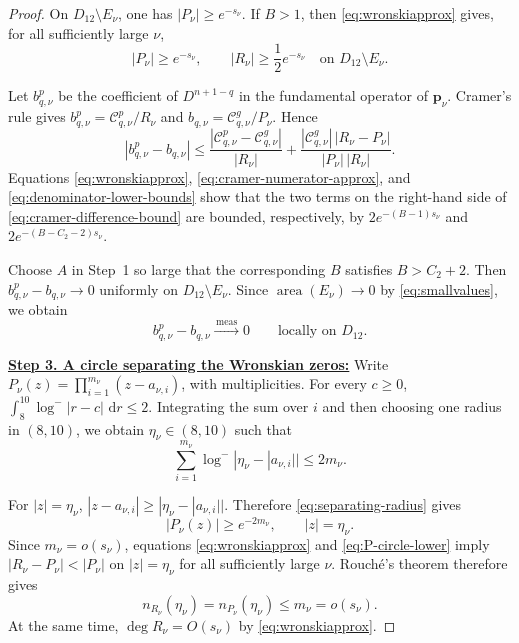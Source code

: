 \documentclass[12pt,letterpaper,reqno]{amsart}
\theoremstyle{definition}
\numberwithin{equation}{section}
\newcommand{\dd}{\,\mathrm d}
\newcommand{\convmeas}{\xrightarrow{\,\mathrm{meas}\,}}
\DeclareMathOperator{\meas}{area}
\newcommand{\pv}{\bm p}
\begin{document}
\begin{proof}
On \(D_{12}\setminus E_\nu\), one has
\(|P_\nu|\geq e^{-s_\nu}\). If \(B>1\), then
\eqref{eq:wronskiapprox} gives, for all sufficiently large \(\nu\),
\begin{equation}\label{eq:denominator-lower-bounds}
 |P_\nu|\geq e^{-s_\nu},
 \qquad
 |R_\nu|\geq\frac12e^{-s_\nu}
 \quad\text{on }D_{12}\setminus E_\nu.
\end{equation}

Let \(b_{q,\nu}^p\) be the coefficient of \(D^{n+1-q}\) in the
fundamental operator of \(\pv_\nu\). Cramer's rule gives
\(b_{q,\nu}^p=\mathcal C_{q,\nu}^p/R_\nu\) and
\(b_{q,\nu}=\mathcal C_{q,\nu}^g/P_\nu\). Hence
\begin{equation}\label{eq:cramer-difference-bound}
 \left|b_{q,\nu}^p-b_{q,\nu}\right|
 \leq
 \frac{|\mathcal C_{q,\nu}^p-\mathcal C_{q,\nu}^g|}
      {|R_\nu|}
 +
 \frac{|\mathcal C_{q,\nu}^g|\,|R_\nu-P_\nu|}
      {|P_\nu|\,|R_\nu|}.
\end{equation}
Equations \eqref{eq:wronskiapprox},
\eqref{eq:cramer-numerator-approx}, and
\eqref{eq:denominator-lower-bounds} show that the two terms on the
right-hand side of \eqref{eq:cramer-difference-bound} are bounded,
respectively, by
\(2e^{-(B-1)s_\nu}\) and
\(2e^{-(B-C_2-2)s_\nu}\).

Choose \(A\) in Step~1 so large that the corresponding \(B\) satisfies
\(B>C_2+2\). Then
\(b_{q,\nu}^p-b_{q,\nu}\to0\) uniformly on
\(D_{12}\setminus E_\nu\). Since
\(\meas(E_\nu)\to0\) by \eqref{eq:smallvalues}, we obtain
\begin{equation}\label{eq:cramercomparison}
 b_{q,\nu}^p-b_{q,\nu}
 \convmeas0
 \qquad\text{locally on }D_{12}.
\end{equation}


\medskip\noindent
\textbf{\underline{Step 3. A circle separating the Wronskian zeros:}}
Write
\(P_\nu(z)=\prod_{i=1}^{m_\nu}(z-a_{\nu,i})\), with multiplicities.
For every \(c\geq0\),
\(\int_8^{10}\log^-|r-c|\,\dd r\leq2\).
Integrating the sum over \(i\) and then choosing one radius in
\((8,10)\), we obtain \(\eta_\nu\in(8,10)\) such that
\begin{equation}\label{eq:separating-radius}
 \sum_{i=1}^{m_\nu}
 \log^-|\eta_\nu-|a_{\nu,i}||
 \leq2m_\nu.
\end{equation}

For \(|z|=\eta_\nu\),
\(|z-a_{\nu,i}|
 \geq|\eta_\nu-|a_{\nu,i}||\).
Therefore \eqref{eq:separating-radius} gives
\begin{equation}\label{eq:P-circle-lower}
 |P_\nu(z)|
 \geq e^{-2m_\nu},
 \qquad |z|=\eta_\nu.
\end{equation}
Since \(m_\nu=o(s_\nu)\), equations
\eqref{eq:wronskiapprox} and \eqref{eq:P-circle-lower} imply
\(|R_\nu-P_\nu|<|P_\nu|\) on \(|z|=\eta_\nu\) for all sufficiently
large \(\nu\). Rouch\'e's theorem therefore gives
\begin{equation}\label{eq:rouche-root-count}
 n_{R_\nu}(\eta_\nu)
 =
 n_{P_\nu}(\eta_\nu)
 \leq m_\nu
 =
 o(s_\nu).
\end{equation}
At the same time,
\(\deg R_\nu=O(s_\nu)\) by \eqref{eq:wronskiapprox}.



\end{proof}
\end{document}
